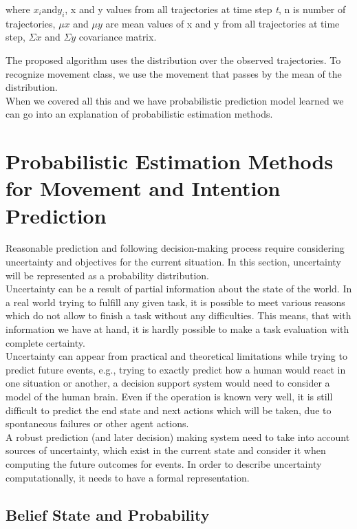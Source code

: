 where $x_i \text{and} y_i$, x and y values from all trajectories at time step \textit{t}, n is number of trajectories, $\mu{x}$ and  $\mu{y}$ are mean values of x and y from all trajectories at time step, $\Sigma{x}$ and $\Sigma{y}$ covariance matrix.


The proposed algorithm uses the distribution over the observed trajectories. To recognize movement class, we use the movement that passes by the mean of the distribution. \\
When we covered all this and we have probabilistic prediction model learned we can go into an explanation of probabilistic estimation methods.

\section{Probabilistic Estimation Methods for Movement and Intention Prediction}

Reasonable prediction and following decision-making process require considering uncertainty and objectives for the current situation. In this section, uncertainty will be represented as a probability distribution. \\
Uncertainty can be a result of partial information about the state of the world. In a real world trying to fulfill any given task, it is possible to meet various reasons which do not allow to finish a task without any difficulties. This means, that with information we have at hand, it is hardly possible to make a task evaluation with complete certainty. \\
Uncertainty can appear from practical and theoretical limitations while trying to predict future events, e.g., trying to exactly predict how a human would react in one situation or another, a decision support system would need to consider a model of the human brain. Even if the operation is known very well, it is still difficult to predict the end state and next actions which will be taken, due to spontaneous failures or other agent actions. \\
A robust prediction (and later decision) making system need to take into account sources of uncertainty, which exist in the current state and consider it when computing the future outcomes for events. In order to describe uncertainty
computationally, it needs to have a formal representation. 

\subsection{Belief State and Probability}

